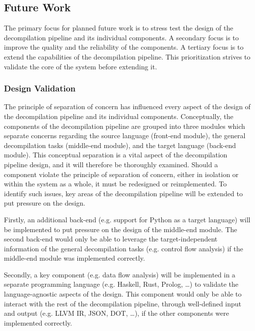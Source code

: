 
\subsection{Future Work}
\label{sec:future_work}

The primary focus for planned future work is to stress test the design of the decompilation pipeline and its individual components. A secondary focus is to improve the quality and the reliability of the components. A tertiary focus is to extend the capabilities of the decompilation pipeline. This prioritization strives to validate the core of the system before extending it.


\subsubsection{Design Validation}
\label{sec:design_validation}

The principle of separation of concern has influenced every aspect of the design of the decompilation pipeline and its individual components. Conceptually, the components of the decompilation pipeline are grouped into three modules which separate concerns regarding the source language (front-end module), the general decompilation tasks (middle-end module), and the target language (back-end module). This conceptual separation is a vital aspect of the decompilation pipeline design, and it will therefore be thoroughly examined. Should a component violate the principle of separation of concern, either in isolation or within the system as a whole, it must be redesigned or reimplemented. To identify such issues, key areas of the decompilation pipeline will be extended to put pressure on the design.


Firstly, an additional back-end (e.g. support for Python as a target language) will be implemented to put pressure on the design of the middle-end module. The second back-end would only be able to leverage the target-independent information of the general decompilation tasks (e.g. control flow analysis) if the middle-end module was implemented correctly.

Secondly, a key component (e.g. data flow analysis) will be implemented in a separate programming language (e.g. Haskell, Rust, Prolog, …) to validate the language-agnostic aspects of the design. This component would only be able to interact with the rest of the decompilation pipeline, through well-defined input and output (e.g. LLVM IR, JSON, DOT, …), if the other components were implemented correctly.

